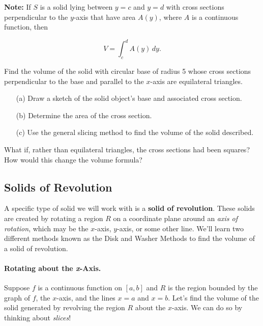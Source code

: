 \documentclass[12pt]{article}
\begin{document}
\vspace{5mm}

\textbf{Note:} If $S$ is a solid lying between $y=c$ and $y=d$ with cross sections perpendicular to the $y$-axis that have area $A(y)$, where $A$ is a continuous function, then 

$$V=\int_c^d A(y)\,dy.$$

\newpage

\Example Find the volume of the solid with circular base of radius 5 whose cross sections perpendicular to the base and parallel to the $x$-axis are equilateral triangles.

\begin{enumerate}
\item[(a)] Draw a sketch of the solid object's base and associated cross section.
\vspace{40mm}

\item[(b)] Determine the area of the cross section.

\vspace{70mm}

\item[(c)] Use the general slicing method to find the volume of the solid described.
\end{enumerate}

\newpage

\ExampleCont What if, rather than equilateral triangles, the cross sections had been squares? How would this change the volume formula?

\vspace{70mm}

\subsection*{Solids of Revolution}

A specific type of solid we will work with is a \textbf{solid of revolution}. These solids are created by rotating a region $R$ on a coordinate plane around an \textit{axis of rotation}, which may be the $x$-axis, $y$-axis, or some other line. We'll learn two different methods known as the Disk and Washer Methods to find the volume of a solid of revolution.

\paragraph{Rotating about the \textbf{\textit{x}}-Axis.} Suppose $f$ is a continuous function on $[a,b]$ and $R$ is the region bounded by the graph of $f$, the $x$-axis, and the lines $x=a$ and $x=b$. Let's find the volume of the solid generated by revolving the region $R$ about the $x$-axis. We can do so by thinking about \textit{slices}!
\end{document}
